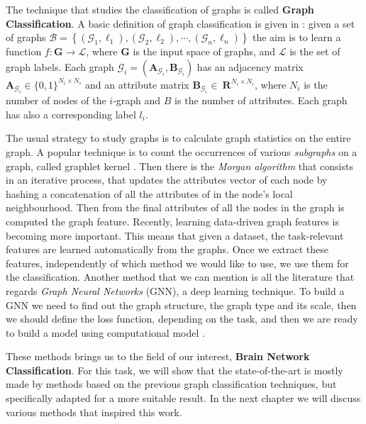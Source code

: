The technique that studies the classification of graphs is called \textbf{Graph Classification}. A basic definition of graph classification is given in \cite{10.1145/3219819.3219980}: given a set of graphs $\mathcal{B}=\left\{\left(\mathcal{G}_{1}, \ell_{1}\right),\left(\mathcal{G}_{2}, \ell_{2}\right), \cdots,\left(\mathcal{G}_{n}, \ell_{n}\right)\right\}$ the aim is to learn a function $f: \mathbf{G} \rightarrow \mathcal{L}$, where $\mathbf{G}$ is the input space of graphs, and $\mathcal{L}$ is the set of graph labels. Each graph $\mathcal{G}_{i}=\left(\mathbf{A}_{\mathcal{G}_{i}}, \mathbf{B}_{\mathcal{G}_{i}}\right)$ has an adjacency matrix $\mathbf{A}_{\mathcal{G}_{i}} \in\{0,1\}^{N_{i} \times N_{i}}$ and an attribute matrix $\mathbf{B}_{\mathcal{G}_{i}} \in\ \mathbf{R}^{N_{i} \times N_{i}}$, where ${N}_{i}$ is the number of nodes of the $i$-graph and $B$ is the number of attributes. Each graph has also a corresponding label $l_{i}$. 	
\vspace{0.5cm}

The usual strategy to study graphs is to calculate graph statistics on the entire graph. A popular technique is to count the occurrences of various \textit{subgraphs} on a graph, called graphlet kernel \cite{pmlr-v5-shervashidze09a}. Then there is the \textit{Morgan algorithm} \cite{Rogers2010ECFP} that consists in an iterative process, that updates the attributes vector of each node by hashing a concatenation of all the attributes of in the node's local neighbourhood. Then from the final attributes of all the nodes in the graph is computed the graph feature. Recently, learning data-driven graph features \cite{NIPS2015_f9be311e} is becoming more important. This means that given a dataset, the task-relevant features are learned automatically from the graphs. Once we extract these features, independently of which method we would like to use, we use them for the classification.
Another method that we can mention is all the literature that regards \textit{Graph Neural Networks} (GNN), a deep learning technique. To build a GNN we need to find out the graph structure, the graph type and its scale, then we should define the loss function, depending on the task, and then we are ready to build a model using computational model \cite{ZHOU202057}. 
\vspace{0.5cm}

These methods brings us to the field of our interest, \textbf{Brain Network Classification}. For this task, we will show that the state-of-the-art is mostly made by methods based on the previous graph classification techniques, but specifically adapted for a more suitable result. In the next chapter we will discuss various methods that inspired this work.